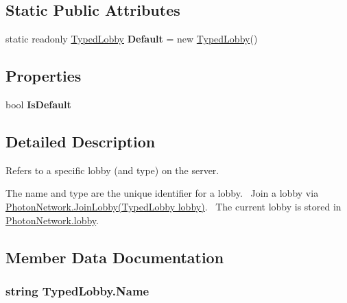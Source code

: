 \subsection*{Static Public Attributes}
\begin{DoxyCompactItemize}
\item 
static readonly \hyperlink{class_typed_lobby}{Typed\+Lobby} {\bfseries Default} = new \hyperlink{class_typed_lobby}{Typed\+Lobby}()\hypertarget{class_typed_lobby_a127f509c2991db15c8d1801ec9fe8b35}{}\label{class_typed_lobby_a127f509c2991db15c8d1801ec9fe8b35}

\end{DoxyCompactItemize}
\subsection*{Properties}
\begin{DoxyCompactItemize}
\item 
bool {\bfseries Is\+Default}\hypertarget{class_typed_lobby_a73ad6b86a44c2b93d32748ea667c5427}{}\label{class_typed_lobby_a73ad6b86a44c2b93d32748ea667c5427}

\end{DoxyCompactItemize}


\subsection{Detailed Description}
Refers to a specific lobby (and type) on the server. 

The name and type are the unique identifier for a lobby.~\newline
 Join a lobby via \hyperlink{class_photon_network_a631231346113712f11319749d6e1a3eb}{Photon\+Network.\+Join\+Lobby(\+Typed\+Lobby lobby)}.~\newline
 The current lobby is stored in \hyperlink{class_photon_network_a3af7f8d0082599e6e3a56a5b1481a505}{Photon\+Network.\+lobby}. 

\subsection{Member Data Documentation}
\subsubsection[{\texorpdfstring{Name}{Name}}]{\setlength{\rightskip}{0pt plus 5cm}string Typed\+Lobby.\+Name}\hypertarget{class_typed_lobby_acd1dfdf3ed901ee8ebe75587fcd0c60b}{}\label{class_typed_lobby_acd1dfdf3ed901ee8ebe75587fcd0c60b}


